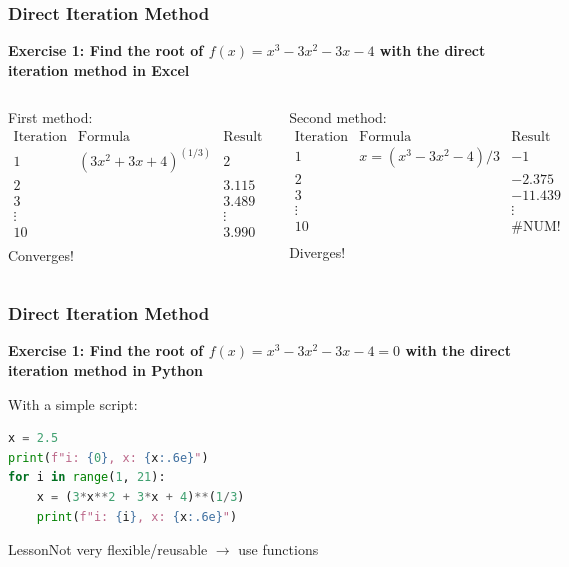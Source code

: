   \begin{frame}[fragile]
    \frametitle{Direct Iteration Method}
  
      \textbf{Exercise 1: Find the root of \(f(x) = x^3 -3x^2 - 3x - 4\) with the direct iteration method in Excel}
      \vspace{0.5cm}
      \begin{columns}
      First method:\newline
      \vspace{0.2cm}
        \(
        \begin{array}{c|c|c}
        \text{Iteration} & \text{Formula} & \text{Result} \\
        \hline
        1 & (3x^2 + 3x + 4)^{(1/3)} & 2 \\
        2 & & 3.115 \\
        3 & & 3.489 \\
        \vdots & & \vdots \\
        10 & & 3.990 \\
        \end{array}
        \)
        \newline
        \newline
        \vspace{0.2cm}
        Converges!
        
        Second method:\newline
        \vspace{0.2cm}
        \(
        \begin{array}{c|c|c}
        \text{Iteration} & \text{Formula} & \text{Result} \\
        \hline
        1 & x = (x^3 - 3x^2 - 4)/3 & -1 \\
        2 & & -2.375 \\
        3 & & -11.439 \\
        \vdots & & \vdots \\
        10 & & \text{\#NUM!} \\
        \end{array}
        \)
        \newline
        \newline
        \vspace{0.2cm}
        Diverges!
      \end{columns}
  \end{frame}
  
  \begin{frame}[fragile]
    \frametitle{Direct Iteration Method}
    \textbf{Exercise 1: Find the root of \(f(x) = x^3 - 3x^2 - 3x - 4 = 0\) with the direct iteration method in Python}
  
    With a simple script:
    \begin{lstlisting}[language=Python]
x = 2.5
print(f"i: {0}, x: {x:.6e}")
for i in range(1, 21):
    x = (3*x**2 + 3*x + 4)**(1/3)
    print(f"i: {i}, x: {x:.6e}")
    \end{lstlisting}
    \begin{block}{Lesson}Not very flexible/reusable \(\rightarrow\) use functions\end{block}
  \end{frame}
  
